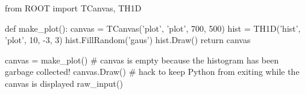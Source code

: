 \begin{footnotesize}
\begin{pyglist}[language=python,texcl=true,abovecaptionskip=0,style=vs,bgcolor=Moccasin]
from ROOT import TCanvas, TH1D

def make_plot():
    canvas = TCanvas('plot', 'plot', 700, 500)
    hist = TH1D('hist', 'plot', 10, -3, 3)
    hist.FillRandom('gaus')
    hist.Draw()
    return canvas

canvas = make_plot()
# canvas is empty because the histogram has been garbage collected!
canvas.Draw()
# hack to keep Python from exiting while the canvas is displayed
raw_input()
\end{pyglist}
\end{footnotesize}
